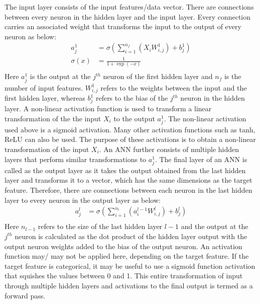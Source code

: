 \documentclass{article}
\begin{document}
The input layer consists of the input features/data vector. There are connections between every neuron in the hidden layer and the input layer. Every connection carries an associated weight that transforms the input to the output of every neuron as below:
\begin{equation}
\begin{split}
    a^1_{j}&=\sigma(\sum_{i=1}^{n_f}(X_iW^1_{i,j}) + b^1_j)\\
    \sigma(x)&=\frac{1}{1+\exp(-x)}\\
\end{split}
\end{equation}
Here $a^1_j$ is the output at the $j^{th}$ neuron of the first hidden layer and $n_f$ is the number of input features. $W^1_{i,j}$ refers to the weights between the input and the first hidden layer, whereas $b^1_j$ refers to the bias of the $j^{th}$ neuron in the hidden layer. A non-linear activation function is used to transform a linear transformation of the the input $X_i$ to the output $a^1_{j}$. The non-linear activation used above is a sigmoid activation. Many other activation functions such as tanh, ReLU can also be used.  The purpose of these activations is to obtain a non-linear transformation of the input $X_i$. An ANN further consists of multiple hidden layers that perform similar transformations to $a^1_{j}$. The final layer of an ANN is called as the output layer as it takes the output  obtained from the last hidden layer and transforms it to a vector, which has the same dimensions as the target feature. Therefore, there are connections between each neuron in the last hidden layer to every neuron in the output layer as below:
\begin{equation}
\begin{split}
    a^l_j&=\sigma(\sum_{i=1}^{n_l}(a^{l-1}_iW^l_{i,j}) + b^l_j)\\
\end{split}
\end{equation}
Here $n_{l-1}$ refers to the size of the last hidden layer $l-1$ and the output at the $j^{th}$ neuron is calculated as the dot product of the hidden layer output with the output neuron weights added to the bias of the output neuron. An activation function may/ may not be applied here, depending on the target feature. If the target feature is categorical, it may be useful to use a sigmoid function activation that squishes the values between 0 and 1. This entire transformation of input through multiple hidden layers and activations to the final output is termed as a forward pass. 
\end{document}
